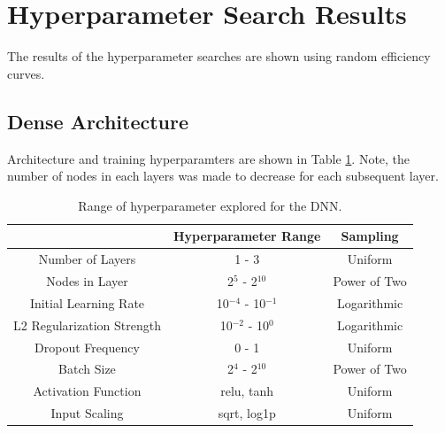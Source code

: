 \section{Hyperparameter Search Results}

The results of the hyperparameter searches are shown using random efficiency curves.


\subsection{Dense Architecture}

Architecture and training hyperparamters are shown in Table \ref{table:hyperparameter_dataset_parameters_DNN}. Note, the number of nodes in each layers was made to decrease for each subsequent layer.

\begin{table}[H]
\centering
\caption{Range of hyperparameter explored for the DNN.}
\label{table:hyperparameter_dataset_parameters_DNN}
\begin{tabular}{c|c|c|}
\cline{2-3}
 & Hyperparameter Range & Sampling \\ \hline
\multicolumn{1}{|c|}{Number of Layers} & 1 - 3 & Uniform \\ \hline
\multicolumn{1}{|c|}{Nodes in Layer} & 2$^{5}$ - 2$^{10}$ & Power of Two \\ \hline
\multicolumn{1}{|c|}{Initial Learning Rate} & 10$^{-4}$ - 10$^{-1}$ & Logarithmic \\ \hline
\multicolumn{1}{|c|}{L2 Regularization Strength} & 10$^{-2}$ - 10$^{0}$ & Logarithmic \\ \hline
\multicolumn{1}{|c|}{Dropout Frequency} & 0 - 1 & Uniform \\ \hline
\multicolumn{1}{|c|}{Batch Size} & 2$^{4}$ - 2$^{10}$ & Power of Two \\ \hline
\multicolumn{1}{|c|}{Activation Function} & relu, tanh & Uniform \\ \hline
\multicolumn{1}{|c|}{Input Scaling} & sqrt, log1p & Uniform \\ \hline
\end{tabular}
\end{table}



